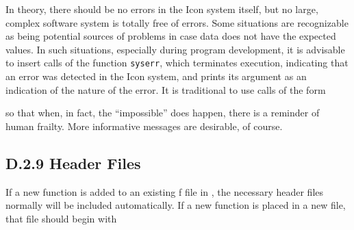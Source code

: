 In theory, there should be no errors in the Icon system itself, but no
large, complex software system is totally free of errors. Some situations
are recognizable as being potential sources of problems in case data does
not have the expected values. In such situations, especially during program
development, it is advisable to insert calls of the function
\texttt{syserr}, which terminates execution, indicating that an error was
detected in the Icon system, and prints its argument as an indication of
the nature of the error. It is traditional to use calls of the form


\noindent so that when, in fact, the ``impossible'' does happen, there is a
reminder of human frailty.  More informative messages are desirable, of
course.

\subsection[D.2.9 Header Files]{D.2.9 Header Files}

If a new function is added to an existing f file in , the
necessary header files normally will be included automatically. If a
new function is placed in a new file, that file should begin with


